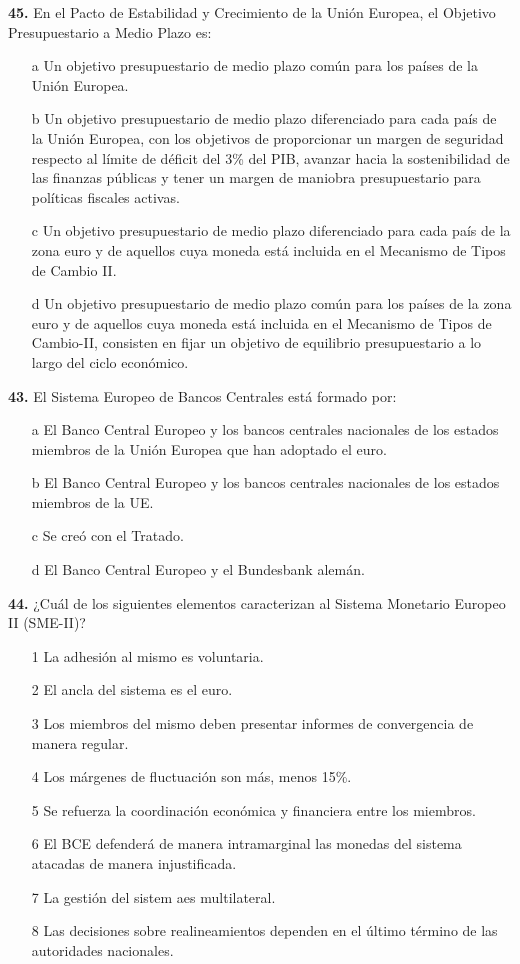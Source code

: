 \documentclass{nuevotema}
\begin{document}
\textbf{45.} En el Pacto de Estabilidad y Crecimiento de la Unión Europea, el Objetivo Presupuestario a Medio Plazo es:
\begin{enumerate}
	\item[a] Un objetivo presupuestario de medio plazo común para los países de la Unión Europea.
	\item[b] Un objetivo presupuestario de medio plazo diferenciado para cada país de la Unión Europea, con los objetivos de proporcionar un margen de seguridad respecto al límite de déficit del 3\% del PIB, avanzar hacia la sostenibilidad de las finanzas públicas y tener un margen de maniobra presupuestario para políticas fiscales activas.
	\item[c] Un objetivo presupuestario de medio plazo diferenciado para cada país de la zona euro y de aquellos cuya moneda está incluida en el Mecanismo de Tipos de Cambio II.
	\item[d] Un objetivo presupuestario de medio plazo común para los países de la zona euro y de aquellos cuya moneda está incluida en el Mecanismo de Tipos de Cambio-II, consisten en fijar un objetivo de equilibrio presupuestario a lo largo del ciclo económico.
\end{enumerate}



\textbf{43.} El Sistema Europeo de Bancos Centrales está formado por:
\begin{enumerate}
	\item[a] El Banco Central Europeo y los bancos centrales nacionales de los estados miembros de la Unión Europea que han adoptado el euro.
	\item[b] El Banco Central Europeo y los bancos centrales nacionales de los estados miembros de la UE.
	\item[c] Se creó con el Tratado.
	\item[d] El Banco Central Europeo y el Bundesbank alemán.
\end{enumerate}

\textbf{44.} ¿Cuál de los siguientes elementos caracterizan al Sistema Monetario Europeo II (SME-II)?

\begin{enumerate}
	\item[1] La adhesión al mismo es voluntaria.
	\item[2] El ancla del sistema es el euro.
	\item[3] Los miembros del mismo deben presentar informes de convergencia de manera regular.
	\item[4] Los márgenes de fluctuación son más, menos 15\%.
	\item[5] Se refuerza la coordinación económica y financiera entre los miembros.
	\item[6] El BCE defenderá de manera intramarginal las monedas del sistema atacadas de manera injustificada.
	\item[7] La gestión del sistem aes multilateral.
	\item[8] Las decisiones sobre realineamientos dependen en el último término de las autoridades nacionales.
\end{enumerate}
\end{document}
